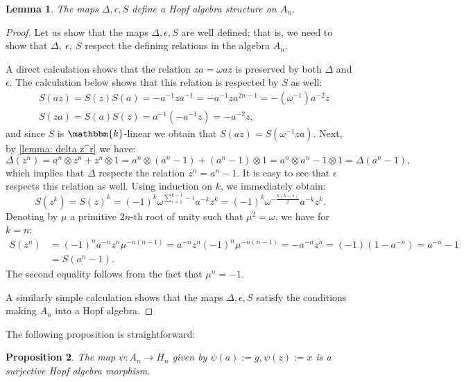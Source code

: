 \documentclass{amsart}
\theoremstyle{plain}%
\newtheorem{lemma}{Lemma}[subsection]
\newtheorem{prop}[lemma]{Proposition}
\theoremstyle{remark}
\newcommand{\1}{\mathbbm{1}}
\newcommand{\kk}{\mathbbm{k}}
\begin{document}
        \begin{lemma}
            The maps $\Delta, \epsilon, S$ define a Hopf algebra structure on $A_{n}$.
        \end{lemma}
        \begin{proof}
            Let us show that the maps $\Delta, \epsilon, S$ are well defined; that is, we need to show that $\Delta,~\epsilon, ~S$ respect the defining relations in the algebra $A_{n}$.  

            A direct calculation shows that the relation $za=\omega az$ is preserved by both $\Delta$ and $\epsilon$. The calculation below shows that this relation is respected by $S$ as well:
            \begin{align*}
                &S(az)=S(z)S(a)=-a^{-1}za^{-1} = -a^{-1}za^{2n-1} = -(\omega^{-1})a^{-2}z\\
                &S(za) = S(a)S(z)=a^{-1}(-a^{-1}z) = -a^{-2}z,
            \end{align*}
            and since $S$ is $\kk$-linear we obtain that $S(az)=S(\omega^{-1} za)$. Next, by \cref{lemma: delta z^r} we have:
            $$
                \Delta(z^n) = a^{n}\otimes z^n+z^n\otimes 1 = a^n\otimes (a^n-1)+(a^n-1)\otimes 1 = a^n\otimes a^n-1\otimes 1 = \Delta(a^n-1),
            $$
            which implies that $\Delta$ respects the relation $z^n=a^n-1$. It is easy to see that $\epsilon$ respects this relation as well. Using induction on $k$, we immediately obtain:
            $$
                S(z^k)=S(z)^k = (-1)^k\omega^{\sum_{i=1}^{k-1}-i}a^{-k}z^k=(-1)^k\omega^{-\frac{k(k-1)}{2}}a^{-k}z^k.
            $$
           Denoting by $\mu$ a primitive $2n$-th root of unity such that $\mu^2 = \omega$, we have for $k=n$:
            \begin{align*}
                S(z^n) &= (-1)^na^{-n}z^n\mu^{-n(n-1)}= a^{-n}z^n(-1)^n\mu^{-n(n-1)}=-a^{-n}z^n = (-1)(1-a^{-n}) = a^{-n}-1\\
                &=S(a^n-1).
            \end{align*}
            The second equality follows from the fact that $\mu^n=-1$.
        
            A similarly simple calculation shows that the maps $\Delta,\epsilon,S$ satisfy the conditions making $A_{n}$ into a Hopf algebra.
            \end{proof}

        

        The following proposition is straightforward:
        \begin{prop}\label{prop:A_n_n_surjects_onto_H_n_n}
         The map $\psi:A_{n}\to{H_{n}}$ given by $\psi(a):=g,\psi(z):=x$ is a surjective Hopf algebra morphism.
        \end{prop}
\end{document}
